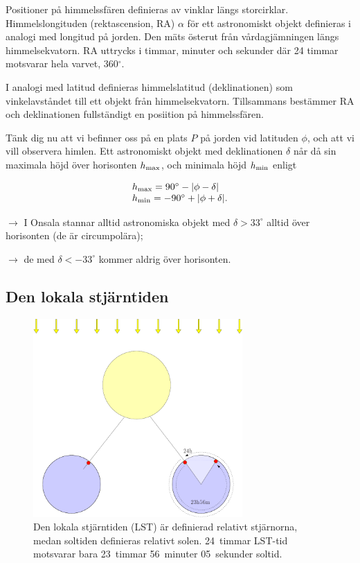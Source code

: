 Positioner på himmelssfären definieras av vinklar längs
storcirklar. Himmelslongituden (rektascension, RA) $\alpha$ för ett
astronomiskt objekt definieras i analogi med longitud på jorden. Den
mäts österut från vårdagjämningen längs himmelsekvatorn. RA uttrycks i
timmar, minuter och sekunder där 24 timmar motsvarar hela varvet,
360$^\circ$.

I analogi med latitud definieras himmelslatitud (deklinationen) som
vinkelavståndet till ett objekt från himmelsekvatorn. Tillsammans
bestämmer RA och deklinationen fullständigt en posiition på
himmelssfären.

Tänk dig nu att vi befinner oss på en plats $P$ på jorden vid
latituden $\phi$, och att vi vill observera himlen. Ett astronomiskt
objekt med deklinationen $\delta$ når då sin maximala höjd över
horisonten $h_{\rm max}$, och minimala höjd $h_{\rm min}$ enligt

\begin{equation}
\begin{array}{l}
h_{\rm max} = 90^\circ -|\phi-\delta| \\
h_{\rm min} = -90^\circ +|\phi+\delta|. 
\end{array}
\end{equation}

{{$\rightarrow$ I Onsala stannar alltid astronomiska
    objekt med $\delta > 33^\circ$ 
alltid över horisonten (de är circumpolära); }}

{{$\rightarrow$ de med $\delta < -33^\circ$ kommer aldrig
    över horisonten.}}


\subsection{Den lokala stjärntiden}

\begin{figure}[ht]
\begin{center}
 \includegraphics[width=8cm]{../figures/lst.pdf}
\end{center}
\caption{Den lokala stjärntiden (LST) är definierad relativt
  stjärnorna, medan soltiden definieras relativt solen. 24~timmar
  LST-tid motsvarar bara 23~timmar 56~minuter 05~sekunder soltid.}
\label{figlst}
\end{figure}


